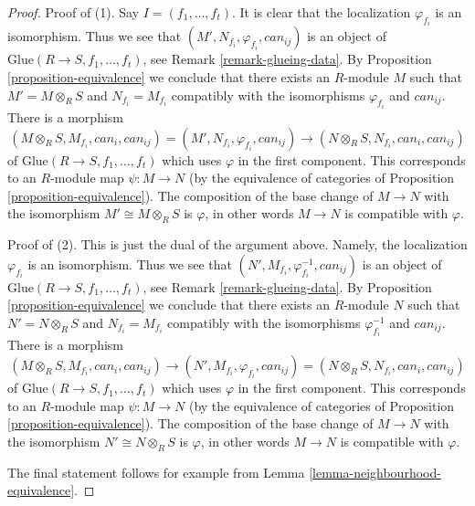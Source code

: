 \documentclass[10pt,a4paper]{amsart}
\theoremstyle{plain}
\theoremstyle{definition}
\theoremstyle{remark}
\numberwithin{equation}{subsection}
\begin{document}
\begin{proof}
Proof of (1). Say $I = (f_1, \ldots, f_t)$. It is clear that
the localization $\varphi_{f_i}$ is an isomorphism.
Thus we see that $(M', N_{f_i}, \varphi_{f_i}, can_{ij})$ is an
object of $\text{Glue}(R \to S, f_1, \ldots, f_t)$, see
Remark \ref{remark-glueing-data}.
By Proposition \ref{proposition-equivalence}
we conclude that there exists an $R$-module $M$ such that
$M' = M \otimes_R S$ and $N_{f_i} = M_{f_i}$ compatibly
with the isomorphisms $\varphi_{f_i}$ and $can_{ij}$. There is a
morphism
$$
(M \otimes_R S, M_{f_i}, can_i, can_{ij}) =
(M', N_{f_i}, \varphi_{f_i}, can_{ij})
\to
(N \otimes_R S, N_{f_i}, can_i, can_{ij})
$$
of $\text{Glue}(R \to S, f_1, \ldots, f_t)$
which uses $\varphi$ in the first component. This
corresponds to an $R$-module map $\psi : M \to N$ (by the equivalence of
categories of Proposition \ref{proposition-equivalence}).
The composition of the base change of $M \to N$ with the
isomorphism $M' \cong M \otimes_R S$ is $\varphi$, in other words
$M \to N$ is compatible with $\varphi$.

\medskip\noindent
Proof of (2). This is just the dual of the argument above.
Namely, the localization $\varphi_{f_i}$ is an isomorphism.
Thus we see that $(N', M_{f_i}, \varphi_{f_i}^{-1}, can_{ij})$ is an
object of $\text{Glue}(R \to S, f_1, \ldots, f_t)$, see
Remark \ref{remark-glueing-data}.
By Proposition \ref{proposition-equivalence}
we conclude that there exists an $R$-module $N$ such that
$N' = N \otimes_R S$ and $N_{f_i} = M_{f_i}$ compatibly
with the isomorphisms $\varphi_{f_i}^{-1}$ and $can_{ij}$. There is a
morphism
$$
(M \otimes_R S, M_{f_i}, can_i, can_{ij}) \to
(N', M_{f_i}, \varphi_{f_i}, can_{ij}) =
(N \otimes_R S, N_{f_i}, can_i, can_{ij})
$$
of $\text{Glue}(R \to S, f_1, \ldots, f_t)$
which uses $\varphi$ in the first component. This
corresponds to an $R$-module map $\psi : M \to N$ (by the equivalence of
categories of Proposition \ref{proposition-equivalence}).
The composition of the base change of $M \to N$ with the
isomorphism $N' \cong N \otimes_R S$ is $\varphi$, in other words
$M \to N$ is compatible with $\varphi$.

\medskip\noindent
The final statement follows for example from
Lemma \ref{lemma-neighbourhood-equivalence}.
\end{proof}
\end{document}
